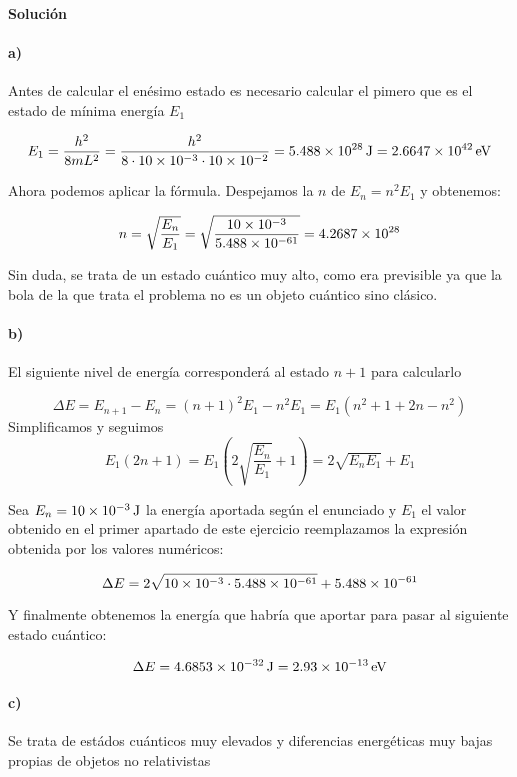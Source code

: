 \documentclass[12pt, a4paper]{article}
\begin{document}
    \paragraph{\textbf{Solución}}
    \paragraph{a)} Antes de calcular el enésimo estado es necesario calcular el pimero que es el estado
    de mínima energía $E_1$

    $$E_1=\frac{h^2}{8mL^2} = \frac{h^2}{8\cdot\num{10d-3}\cdot\num{10d-2}} = \SI{5.488d28}{\J} = \SI{2.6647d42}{\electronvolt}$$

    Ahora podemos aplicar la fórmula. Despejamos la $n$ de $E_n = n^2 E_1$ y obtenemos:

    $$n = \sqrt{\frac{E_n}{E_1}} = \sqrt{\frac{\num{10d-3}}{\num{5.488d-61}}} = \num{4.2687d28}$$

    Sin duda, se trata de un estado cuántico muy alto, como era previsible ya que la bola de la
    que trata el problema no es un objeto cuántico sino clásico.

    \paragraph{b)} El siguiente nivel de energía corresponderá al estado $n+1$ para calcularlo

    $$\Delta E = E_{n+1}-E_n = (n+1)^2 E_1 - n^2 E_1=
    E_1(n^2+1+2n-n^2) $$
    Simplificamos y seguimos
    $$E_1(2n+1) = E_1\left(2 \sqrt{\frac{E_n}{E_1}}+1\right) = 2\sqrt{E_nE_1}+E_1$$

    Sea $E_n = \SI{10d-3}{\J}$ la energía aportada según el enunciado y $E_1$ el valor
    obtenido en el primer apartado de este ejercicio reemplazamos la expresión obtenida
    por los valores numéricos:

    $$\Delta E = 2 \sqrt{\num{10d-3} \cdot \num{5.488d-61}} + \num{5.488d-61}$$

    Y finalmente obtenemos la energía que habría que aportar para pasar al siguiente
    estado cuántico:

    $$\Delta E = \SI{4.6853d-32}{\J} = \SI{2.93d-13}{\electronvolt}$$

    \paragraph{c)} Se trata de estádos cuánticos muy elevados y diferencias energéticas muy
    bajas propias de objetos no relativistas
\end{document}
